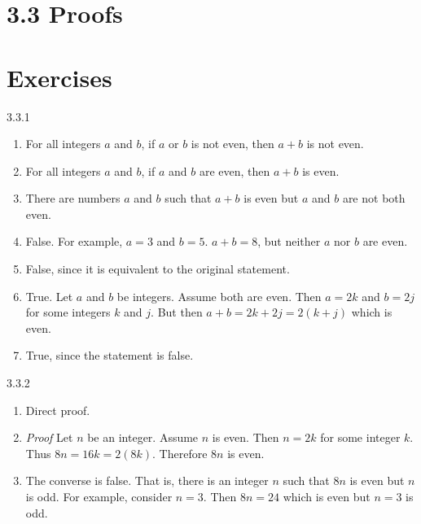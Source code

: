 \documentclass[11pt,]{book}
\makeatletter
\theoremstyle{ptxplainnotitle}
\theoremstyle{ptxplaintitle}
\renewcommand*{\proofname}{Proof}
\renewenvironment{proof}[1][\proofname]{\par
  \pushQED{\qed}%
  \normalfont \topsep6\p@\@plus6\p@\relax
  \trivlist
  \item\relax
    {\itshape
    #1\@addpunct{.}}\hspace\labelsep\ignorespaces
}{%
  \popQED\endtrivlist\@endpefalse
}
\theoremstyle{ptxdefinitionnotitle}
\theoremstyle{ptxdefinitiontitle}
\theoremstyle{ptxdefinitionnotitle}
\theoremstyle{ptxdefinitiontitle}
\theoremstyle{ptxdefinitionnotitle}
\theoremstyle{ptxdefinitiontitle}
\theoremstyle{ptxdefinitiontitlenonumber}
\theoremstyle{ptxdefinitiontitlenonumber}
\numberwithin{equation}{chapter}
\makeatother
\begin{document}
\section*{3.3 Proofs}
\section*{Exercises}
\begin{divisionexercise}{3.3.1}
\textbf{}\hypertarget{p-2375}{}%
\leavevmode%
\begin{enumerate}[label=(\alph*)]
\item\hypertarget{li-1132}{}\hypertarget{p-2376}{}%
For all integers \(a\) and \(b\), if \(a\) or \(b\) is not even, then \(a+b\) is not even.%
\item\hypertarget{li-1133}{}\hypertarget{p-2377}{}%
For all integers \(a\) and \(b\), if \(a\) and \(b\) are even, then \(a+b\) is even.%
\item\hypertarget{li-1134}{}\hypertarget{p-2378}{}%
There are numbers \(a\) and \(b\) such that \(a+b\) is even but \(a\) and \(b\) are not both even.%
\item\hypertarget{li-1135}{}\hypertarget{p-2379}{}%
False. For example, \(a = 3\) and \(b = 5\). \(a+b = 8\), but neither \(a\) nor \(b\) are even.%
\item\hypertarget{li-1136}{}\hypertarget{p-2380}{}%
False, since it is equivalent to the original statement.%
\item\hypertarget{li-1137}{}\hypertarget{p-2381}{}%
True. Let \(a\) and \(b\) be integers. Assume both are even. Then \(a = 2k\) and \(b = 2j\) for some integers \(k\) and \(j\). But then \(a+b = 2k + 2j = 2(k+j)\) which is even.%
\item\hypertarget{li-1138}{}\hypertarget{p-2382}{}%
True, since the statement is false.%
\end{enumerate}
%
\end{divisionexercise}%
\begin{divisionexercise}{3.3.2}
\textbf{}\hypertarget{p-2386}{}%
\leavevmode%
\begin{enumerate}[label=(\alph*)]
\item\hypertarget{li-1141}{}\hypertarget{p-2387}{}%
Direct proof. \begin{proof}\hypertarget{proof-31}{}
\hypertarget{p-2388}{}%
Let \(n\) be an integer. Assume \(n\) is even. Then \(n = 2k\) for some integer \(k\). Thus \(8n = 16k = 2(8k)\). Therefore \(8n\) is even.%
\end{proof}
%
\item\hypertarget{li-1142}{}\hypertarget{p-2389}{}%
The converse is false. That is, there is an integer \(n\) such that \(8n\) is even but \(n\) is odd. For example, consider \(n = 3\). Then \(8n = 24\) which is even but \(n = 3\) is odd.%
\end{enumerate}
%
\end{divisionexercise}%
\end{document}
